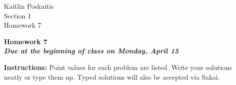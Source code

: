 \documentclass[11pt]{article}
\begin{document}
\sloppy

\noindent Kaitlin Poskaitis\\
Section 1\\
Homework 7

\begin{center}
\LARGE{\textbf{Homework 7}}\\
\large{\textbf{\emph{Due at the beginning of class on Monday, April 15}}}
\end{center}

\vspace{.1in}

\noindent\textbf{Instructions:} Point values for each problem are listed.
Write your solutions neatly or type them up.  Typed solutions will also be
accepted via Sakai.
\end{document}
